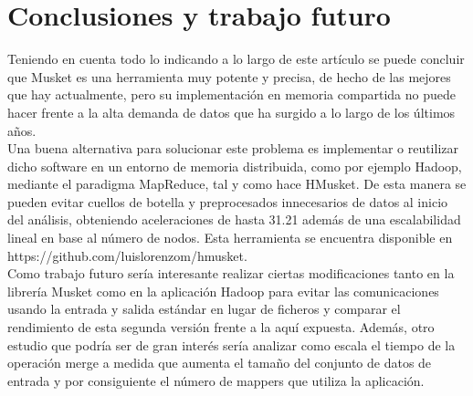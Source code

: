 \documentclass[conference]{IEEEtran}
\begin{document}
\section{Conclusiones y trabajo futuro}
Teniendo en cuenta todo lo indicando a lo largo de este artículo se puede concluir que Musket es una herramienta muy potente y precisa, de hecho de las mejores que hay actualmente, pero su implementación en memoria compartida no puede hacer frente a la alta demanda de datos que ha surgido a lo largo de los últimos años.\\
Una buena alternativa para solucionar este problema es implementar o reutilizar dicho software en un entorno de memoria distribuida, como por ejemplo Hadoop, mediante el paradigma MapReduce, tal y como hace HMusket. De esta manera se pueden evitar cuellos de botella y preprocesados innecesarios de datos al inicio del análisis, obteniendo aceleraciones de hasta 31.21 además de una escalabilidad lineal en base al número de nodos. Esta herramienta se encuentra disponible en https://github.com/luislorenzom/hmusket.\\

Como trabajo futuro sería interesante realizar ciertas modificaciones tanto en la librería Musket como en la aplicación Hadoop para evitar las comunicaciones usando la entrada y salida estándar en lugar de ficheros y comparar el rendimiento de esta segunda versión frente a la aquí expuesta. Además, otro estudio que podría ser de gran interés sería analizar como escala el tiempo de la operación merge a medida que aumenta el tamaño del conjunto de datos de entrada y por consiguiente el número de mappers que utiliza la aplicación.\\




\end{document}
